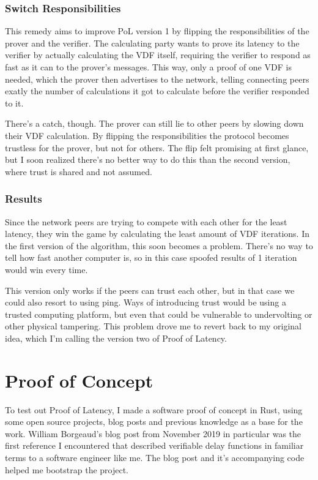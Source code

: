 \subsection{Switch Responsibilities}
This remedy aims to improve PoL version 1 by flipping the responsibilities of the prover and the verifier. The calculating party wants to prove its latency to the verifier by actually calculating the VDF itself, requiring the verifier to respond as fast as it can to the prover's messages. This way, only a proof of one VDF is needed, which the prover then advertises to the network, telling connecting peers exatly the number of calculations it got to calculate before the verifier responded to it. 

There's a catch, though. The prover can still lie to other peers by slowing down their VDF calculation. By flipping the responsibilities the protocol becomes trustless for the prover, but not for others. The flip felt promising at first glance, but I soon realized there's no better way to do this than the second version, where trust is shared and not assumed.

\subsection{Results}
Since the network peers are trying to compete with each other for the least latency, they win the game by calculating the least amount of VDF iterations. In the first version of the algorithm, this soon becomes a problem. There's no way to tell how fast another computer is, so in this case spoofed results of 1 iteration would win every time.

This version only works if the peers can trust each other, but in that case we could also resort to using ping. Ways of introducing trust would be using a trusted computing platform, but even that could be vulnerable to undervolting or other physical tampering. This problem drove me to revert back to my original idea, which I'm calling the version two of Proof of Latency.

\chapter{Proof of Concept}
\label{Proof of Concept}
To test out Proof of Latency, I made a software proof of concept in Rust, using some open source projects, blog posts and previous knowledge as a base for the work. William Borgeaud's blog post\cite{Borgeaud2019-wk} from November 2019 in particular was the first reference I encountered that described verifiable delay functions in familiar terms to a software engineer like me. The blog post and it's accompanying code\cite{Borgeaud2019-wk} helped me bootstrap the project.

